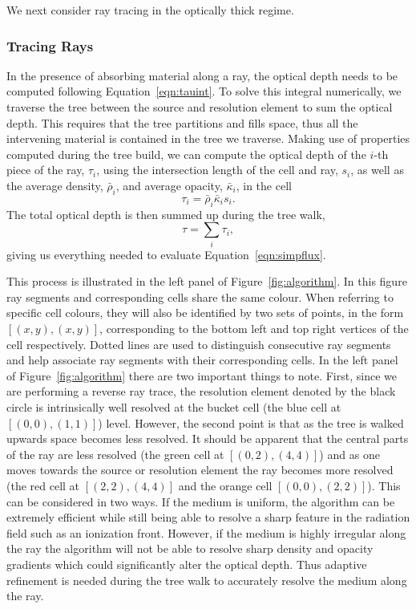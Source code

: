 \documentclass[fleq,usenatbib]{mnras}
\begin{document}
{We next consider ray tracing in the optically thick regime.

\subsubsection{Tracing Rays}
In the presence of absorbing material along a ray, the optical depth needs to 
be computed following
Equation~\ref{eqn:tauint}. To solve this integral numerically, we traverse 
the tree between the source and resolution element to sum the optical 
depth. This requires that the tree partitions and fills space, thus all 
the intervening material is contained in the tree we traverse. Making 
use of properties computed during the tree build, we can compute the optical 
depth of the $i$-th piece of the ray, $\tau_i$, using the intersection length 
of the cell and ray, $s_i$, as well as the average density, $\bar{\rho}_i$, 
and average opacity, $\bar{\kappa}_i$, in the cell
\begin{equation}
\label{eqn:taui}
\tau_i = \bar{\rho}_i \bar{\kappa}_i s_i.
\end{equation}
The total optical depth is then summed up during the tree walk,
\begin{equation}
\label{eqn:tausum}
\tau = \sum_i \tau_i,
\end{equation}
giving us everything needed to evaluate Equation~\ref{eqn:simpflux}. 

This process is illustrated in the left panel of Figure~\ref{fig:algorithm}. 
In this figure ray segments and corresponding cells share 
the same colour. When referring to specific cell colours, they will also be 
identified by two sets of points, in the form $[(x,y),(x,y)]$, corresponding 
to the bottom left and top right vertices of the cell respectively. Dotted 
lines are used to distinguish consecutive ray segments and help associate ray 
segments with their corresponding cells. In the left panel of 
Figure~\ref{fig:algorithm} there are two important things to note. First, 
since we are performing a reverse ray trace, the resolution element denoted by 
the black circle is intrinsically well resolved at the bucket cell (the blue 
cell at $[(0,0),(1,1)]$) level. However, the second point is that as the tree 
is walked upwards space becomes less resolved. It should be apparent that the 
central parts of the ray are less resolved (the green cell at $[(0,2),(4,4)]$) 
and as one moves towards the source or resolution element the ray becomes more 
resolved (the red cell at $[(2,2),(4,4)]$ and the orange cell 
$[(0,0),(2,2)]$). This can be considered in two ways. If the medium is 
uniform, the algorithm can be extremely efficient while still being able to 
resolve a sharp feature in the radiation field such as an ionization front. 
However, if the medium is highly irregular along the ray the algorithm will 
not be able to resolve sharp density and opacity gradients which could 
significantly alter the optical depth. Thus adaptive refinement is needed 
during the tree walk to accurately resolve the medium along the ray.

}
\end{document}
